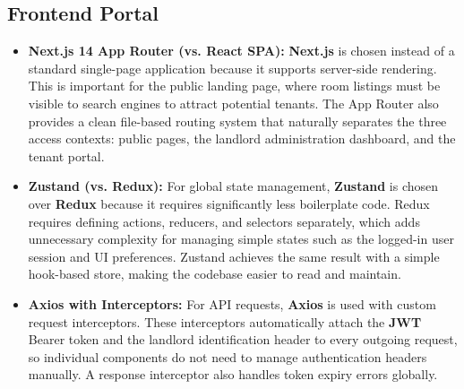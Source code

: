 \subsection{Frontend Portal}
\begin{itemize}
    \item \textbf{Next.js 14 App Router (vs. React SPA):} \textbf{Next.js} is chosen instead of a standard single-page application because it supports server-side rendering. This is important for the public landing page, where room listings must be visible to search engines to attract potential tenants. The App Router also provides a clean file-based routing system that naturally separates the three access contexts: public pages, the landlord administration dashboard, and the tenant portal.

    \item \textbf{Zustand (vs. Redux):} For global state management, \textbf{Zustand} is chosen over \textbf{Redux} because it requires significantly less boilerplate code. Redux requires defining actions, reducers, and selectors separately, which adds unnecessary complexity for managing simple states such as the logged-in user session and UI preferences. Zustand achieves the same result with a simple hook-based store, making the codebase easier to read and maintain.

    \item \textbf{Axios with Interceptors:} For API requests, \textbf{Axios} is used with custom request interceptors. These interceptors automatically attach the \textbf{JWT} Bearer token and the landlord identification header to every outgoing request, so individual components do not need to manage authentication headers manually. A response interceptor also handles token expiry errors globally.
\end{itemize}

